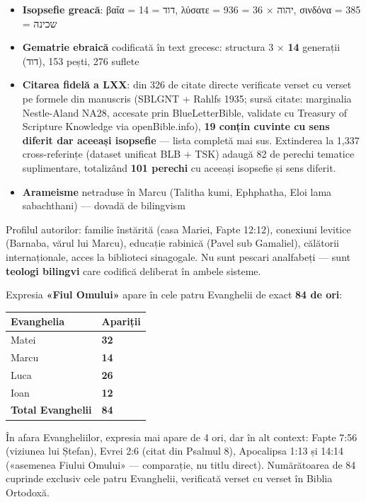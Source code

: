 \documentclass[12pt,a4paper,twoside,openany]{book}
\begin{document}
\begin{itemize}
  \item \textbf{Isopsefie greacă}: βαΐα = 14 = דוד, λύσατε = 936 = 36 × יהוה, σινδόνα = 385 = שכינה
  \item \textbf{Gematrie ebraică} codificată în text grecesc: structura 3 × \textbf{14} generații (דוד), 153 pești, 276 suflete
  \item \textbf{Citarea fidelă a LXX}: din 326 de citate directe verificate verset cu verset pe formele din manuscris (SBLGNT + Rahlfs 1935; sursă citate: marginalia Nestle-Aland NA28, accesate prin BlueLetterBible, validate cu Treasury of Scripture Knowledge via openBible.info), \textbf{19 conțin cuvinte cu sens diferit dar aceeași isopsefie} --- lista completă mai sus. Extinderea la 1{,}337 cross-referințe (dataset unificat BLB + TSK) adaugă 82 de perechi tematice suplimentare, totalizând \textbf{101 perechi} cu aceeași isopsefie și sens diferit.
  \item \textbf{Arameisme} netraduse în Marcu (Talitha kumi, Ephphatha, Eloi lama sabachthani) --- dovadă de bilingvism
\end{itemize}

Profilul autorilor: familie înstărită (casa Mariei, Fapte 12:12), conexiuni levitice (Barnaba, vărul lui Marcu), educație rabinică (Pavel sub Gamaliel), călătorii internaționale, acces la biblioteci sinagogale. Nu sunt pescari analfabeți --- sunt \textbf{teologi bilingvi} care codifică deliberat în ambele sisteme.

\bigskip

Expresia \textbf{«Fiul Omului»} apare în cele patru Evanghelii de exact \textbf{84 de ori}:

\begin{center}
\small
\begin{tabular}{L{10.1cm}L{5.0cm}}
\toprule
{}
\textbf{Evanghelia} & \textbf{Apariții} \\
\midrule
Matei & \textbf{32} \\
Marcu & \textbf{14} \\
Luca & \textbf{26} \\
Ioan & \textbf{12} \\
\textbf{Total Evanghelii} & \textbf{84} \\
\bottomrule
\end{tabular}
\end{center}
\normalsize
În afara Evangheliilor, expresia mai apare de 4 ori, dar în alt context: Fapte 7:56 (viziunea lui Ștefan), Evrei 2:6 (citat din Psalmul 8), Apocalipsa 1:13 și 14:14 («asemenea Fiului Omului» — comparație, nu titlu direct). Numărătoarea de 84 cuprinde exclusiv cele patru Evanghelii, verificată verset cu verset în Biblia Ortodoxă.
\end{document}
